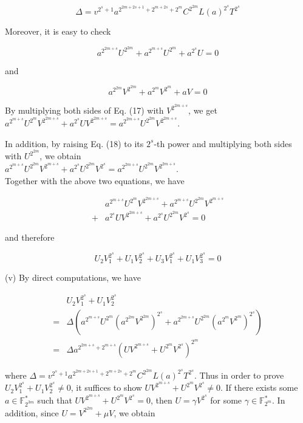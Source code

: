 \documentclass[10pt]{article}
\begin{document}
$$
\Delta=v^{2^{s}+1} a^{2^{2 m+2 s+1}+2^{m+2 s}+2^{m}} C^{2^{2 m}} L(a)^{2^{s}} T^{2^{s}}
$$

Moreover, it is easy to check


\begin{equation*}
a^{2^{2 m+s}} U^{2^{2 m}}+a^{2^{m+s}} U^{2^{m}}+a^{2^{s}} U=0 \tag{17}
\end{equation*}


and


\begin{equation*}
a^{2^{2 m}} V^{2^{2 m}}+a^{2^{m}} V^{2^{m}}+a V=0 \tag{18}
\end{equation*}


By multiplying both sides of Eq. (17) with $V^{2^{2 m+s}}$, we get $a^{2^{m+s}} U^{2^{m}} V^{2^{2 m+s}}+a^{2^{s}} U V^{2^{2 m+s}}=a^{2^{2 m+s}} U^{2^{2 m}} V^{2^{2 m+s}}$.

In addition, by raising Eq. (18) to its $2^{s}$-th power and multiplying both sides with $U^{2^{2 m}}$, we obtain\\
$a^{2^{m+s}} U^{2^{2 m}} V^{2^{m+s}}+a^{2^{s}} U^{2^{2 m}} V^{2^{s}}=a^{2^{2 m+s}} U^{2^{2 m}} V^{2^{2 m+s}}$.\\
Together with the above two equations, we have

$$
\begin{aligned}
& a^{2^{m+s}} U^{2^{m}} V^{2^{2 m+s}}+a^{2^{m+s}} U^{2^{2 m}} V^{2^{m+s}} \\
+ & a^{2^{s}} U V^{2^{2 m+s}}+a^{2^{s}} U^{2^{2 m}} V^{2^{s}}=0
\end{aligned}
$$

and therefore

$$
U_{2} V_{1}^{2^{s}}+U_{1} V_{2}^{2^{s}}+U_{3} V_{1}^{2^{s}}+U_{1} V_{3}^{2^{s}}=0
$$

(v) By direct computations, we have

$$
\begin{aligned}
& U_{2} V_{1}^{2^{s}}+U_{1} V_{2}^{2^{s}} \\
= & \Delta\left(a^{2^{m+s}} U^{2^{m}}\left(a^{2^{2 m}} V^{2^{2 m}}\right)^{2^{s}}+a^{2^{2 m+s}} U^{2^{2 m}}\left(a^{2^{m}} V^{2^{m}}\right)^{2^{s}}\right) \\
= & \Delta a^{2^{2 m+s}+2^{m+s}}\left(U V^{2^{m+s}}+U^{2^{m}} V^{2^{s}}\right)^{2^{m}}
\end{aligned}
$$

where $\Delta=v^{2^{s}+1} a^{2^{2 m+2 s+1}+2^{m+2 s}+2^{m}} C^{2^{2 m}} L(a)^{2^{s}} T^{2^{s}}$. Thus in order to prove $U_{2} V_{1}^{2^{s}}+U_{1} V_{2}^{2^{s}} \neq 0$, it suffices to show $U V^{2^{m+s}}+U^{2^{m}} V^{2^{s}} \neq 0$. If there exists some $a \in \mathbb{F}_{2^{3 m}}^{*}$ such that $U V^{2^{m+s}}+U^{2^{m}} V^{2^{s}}=0$, then $U=\gamma V^{2^{s}}$ for some $\gamma \in \mathbb{F}_{2^{m}}^{*}$. In addition, since $U=V^{2^{2 m}}+\mu V$, we obtain
\end{document}
